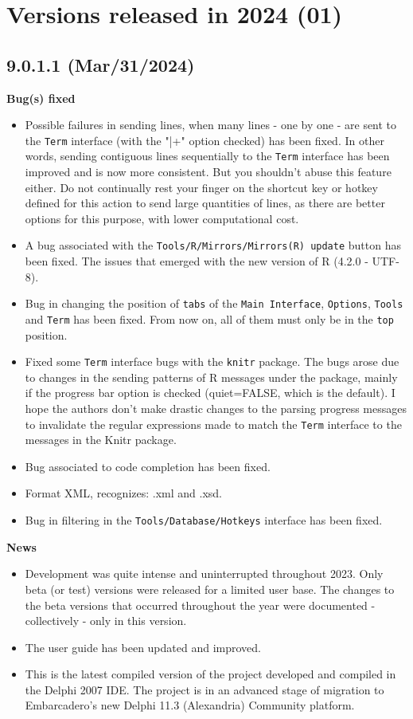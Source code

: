 
\hypertarget{2024}{}
\section{Versions released in 2024 (01)}

\subsection*{9.0.1.1 (Mar/31/2024)}
\textbf{Bug(s) fixed}
\begin{itemize}
   \item Possible failures in sending lines, when many lines - one by one - are sent to the \texttt{Term} interface
   (with the "|+" option checked) has been fixed. In other words, sending contiguous lines sequentially to the
   \texttt{Term} interface has been improved and is now more consistent. But you shouldn't abuse this feature either.
   Do not continually rest your finger on the shortcut key or hotkey defined for this action to send large quantities
   of lines, as there are better options for this purpose, with lower computational cost.
   \item A bug associated with the \texttt{Tools/R/Mirrors/Mirrors(R) update} button has been fixed.
    The issues that emerged with the new version of R (4.2.0 - UTF-8).
   \item Bug in changing the position of \texttt{tabs} of the \texttt{Main Interface}, \texttt{Options},
    \texttt{Tools} and \texttt{Term} has been fixed. From now on, all of them must only be in the \texttt{top}
    position.
   \item Fixed some \texttt{Term} interface bugs with the \texttt{knitr} package. The bugs arose due to
    changes in the sending patterns of R messages under the package, mainly if the progress bar option is
    checked (quiet=FALSE, which is the default). I hope the authors don't make drastic changes to the
    parsing progress messages to invalidate the regular expressions made to match the \texttt{Term}
    interface to the messages in the Knitr package.
   \item Bug associated to code completion has been fixed.
   \item Format XML, recognizes: .xml and .xsd.
   \item Bug in filtering in the \texttt{Tools/Database/Hotkeys} interface has been fixed.
\end{itemize}
   
\textbf{News}
\begin{itemize}
  \item Development was quite intense and uninterrupted throughout 2023.
   Only beta (or test) versions were released for a limited user base.
   The changes to the beta versions that occurred throughout the year were
   documented - collectively - only in this version.
  \item The user guide has been updated and improved.
  \item This is the latest compiled version of the project developed and compiled in the Delphi 2007 IDE.
   The project is in an advanced stage of migration to Embarcadero's new Delphi 11.3 (Alexandria) Community platform.
\end{itemize}

